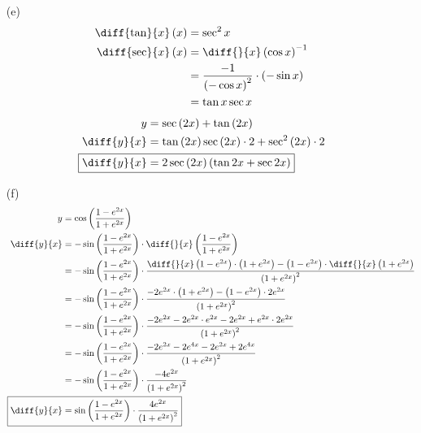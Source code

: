 \documentclass{article}
\begin{document}
\begin{itemize}
\item[(e)]
    \begin{align*}
        \diff{\tan}{x}\left(x\right)&=\sec^2x \\
        \diff{\sec}{x}\left(x\right)&=\diff{}{x}\left(\cos x\right)^{-1}\\
        &=\frac{-1}{\left(-\cos x\right)^2}\cdot\left(-\sin x\right) \\
        &=\tan x\sec x \\
    \end{align*}
    \begin{align*}
        y&=\sec\left(2x\right)+\tan\left(2x\right) \\
        \diff{y}{x}&=\tan\left(2x\right)\sec\left(2x\right)\cdot2+\sec^2\left(2x\right)\cdot2 \\
        \Aboxed{\diff{y}{x}&=2\sec\left(2x\right)\left(\tan2x+\sec2x\right)} \\
    \end{align*}

\item[(f)]
    \begin{align*}
        y&=\cos\left(\frac{1-e^{2x}}{1+e^{2x}}\right) \\
        \diff{y}{x}&=-\sin\left(\frac{1-e^{2x}}{1+e^{2x}}\right)\cdot\diff{}{x}\left(\frac{1-e^{2x}}{1+e^{2x}}\right) \\
        &=-\sin\left(\frac{1-e^{2x}}{1+e^{2x}}\right)\cdot\frac{\diff{}{x}\left(1-e^{2x}\right)\cdot\left(1+e^{2x}\right)-\left(1-e^{2x}\right)\cdot\diff{}{x}\left(1+e^{2x}\right)}{\left(1+e^{2x}\right)^2} \\
        &=-\sin\left(\frac{1-e^{2x}}{1+e^{2x}}\right)\cdot\frac{-2e^{2x}\cdot\left(1+e^{2x}\right)-\left(1-e^{2x}\right)\cdot2e^{2x}}{\left(1+e^{2x}\right)^2} \\
        &=-\sin\left(\frac{1-e^{2x}}{1+e^{2x}}\right)\cdot\frac{-2e^{2x}-2e^{2x}\cdot e^{2x}-2e^{2x}+e^{2x}\cdot2e^{2x}}{\left(1+e^{2x}\right)^2} \\
        &=-\sin\left(\frac{1-e^{2x}}{1+e^{2x}}\right)\cdot\frac{-2e^{2x}-2e^{4x}-2e^{2x}+2e^{4x}}{\left(1+e^{2x}\right)^2} \\
        &=-\sin\left(\frac{1-e^{2x}}{1+e^{2x}}\right)\cdot\frac{-4e^{2x}}{\left(1+e^{2x}\right)^2} \\
        \Aboxed{\diff{y}{x}&=\sin\left(\frac{1-e^{2x}}{1+e^{2x}}\right)\cdot\frac{4e^{2x}}{\left(1+e^{2x}\right)^2}} \\
    \end{align*}


\end{itemize}
\end{document}
